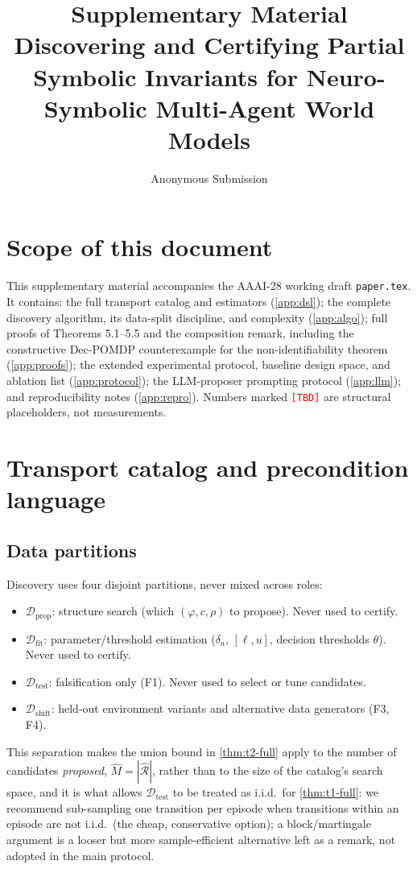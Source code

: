 \documentclass[11pt]{article}
\title{Supplementary Material\\[2pt]\large Discovering and Certifying Partial Symbolic Invariants for Neuro-Symbolic Multi-Agent World Models}
\author{Anonymous Submission}
\date{}
\newcommand{\ph}{\textcolor{red}{\texttt{[TBD]}}}
\theoremstyle{plain}
\theoremstyle{definition}
\theoremstyle{remark}
\begin{document}
\maketitle

\tableofcontents

\section{Scope of this document}

This supplementary material accompanies the AAAI-28 working draft \texttt{paper.tex}. It contains: the full transport catalog and estimators (\autoref{app:dsl}); the complete discovery algorithm, its data-split discipline, and complexity (\autoref{app:algo}); full proofs of Theorems 5.1--5.5 and the composition remark, including the constructive Dec-POMDP counterexample for the non-identifiability theorem (\autoref{app:proofs}); the extended experimental protocol, baseline design space, and ablation list (\autoref{app:protocol}); the LLM-proposer prompting protocol (\autoref{app:llm}); and reproducibility notes (\autoref{app:repro}). Numbers marked \ph{} are structural placeholders, not measurements.

\section{Transport catalog and precondition language}
\label{app:dsl}

\subsection{Data partitions}
Discovery uses four disjoint partitions, never mixed across roles:
\begin{itemize}
  \item $\mathcal{D}_{\mathrm{prop}}$: structure search (which $(\varphi,c,\rho)$ to propose). Never used to certify.
  \item $\mathcal{D}_{\mathrm{fit}}$: parameter/threshold estimation ($\delta_a$, $[\ell,u]$, decision thresholds $\theta$). Never used to certify.
  \item $\mathcal{D}_{\mathrm{test}}$: falsification only (F1). Never used to select or tune candidates.
  \item $\mathcal{D}_{\mathrm{shift}}$: held-out environment variants and alternative data generators (F3, F4).
\end{itemize}
This separation makes the union bound in \autoref{thm:t2-full} apply to the number of candidates \emph{proposed}, $\hat M = |\hat{\mathcal{R}}|$, rather than to the size of the catalog's search space, and it is what allows $\mathcal{D}_{\mathrm{test}}$ to be treated as i.i.d.\ for \autoref{thm:t1-full}: we recommend sub-sampling one transition per episode when transitions within an episode are not i.i.d.\ (the cheap, conservative option); a block/martingale argument is a looser but more sample-efficient alternative left as a remark, not adopted in the main protocol.
\end{document}

